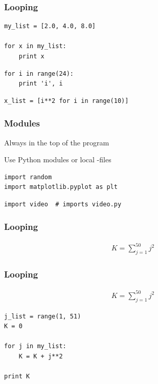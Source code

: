 \documentclass{beamer}
\begin{document}
\begin{frame}[fragile]

    \frametitle{Looping}


\begin{lstlisting}
my_list = [2.0, 4.0, 8.0]

for x in my_list:
    print x
\end{lstlisting}


\begin{lstlisting}
for i in range(24):
    print 'i', i
\end{lstlisting}


\begin{lstlisting}
x_list = [i**2 for i in range(10)]
\end{lstlisting}


\end{frame}


\begin{frame}[fragile]

    \frametitle{Modules}

Always in the top of the program

Use Python modules or local -files

\bigskip

\begin{lstlisting}
import random
import matplotlib.pyplot as plt
\end{lstlisting}

\begin{lstlisting}
import video  # imports video.py
\end{lstlisting}


\end{frame}



\begin{frame}[fragile]

    \frametitle{Looping}

    \begin{align*}
        K = \sum_{j=1}^{50} j^2
    \end{align*}

    \bigskip
    \bigskip
\end{frame}

\begin{frame}[fragile]

    \frametitle{Looping}

    \begin{align*}
        K = \sum_{j=1}^{50} j^2
    \end{align*}

    \bigskip
    \bigskip

\begin{lstlisting}
j_list = range(1, 51)
K = 0

for j in my_list:
    K = K + j**2 

print K
\end{lstlisting}


\end{frame}
\end{document}
